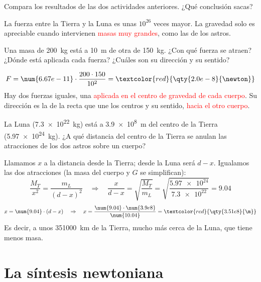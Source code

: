 \begin{exercise}
    Compara los resultados de las dos actividades anteriores. ¿Qué conclusión sacas?
    \begin{solu}
        La fuerza entre la Tierra y la Luna es unas \(10^{26}\) veces mayor. La gravedad solo es apreciable cuando intervienen \textcolor{red}{masas muy grandes}, como las de los astros.
    \end{solu}
\end{exercise}

\begin{exercise}
    Una masa de \qty{200}{\kg} está a \qty{10}{\m} de otra de \qty{150}{\kg}. ¿Con qué fuerza se atraen? ¿Dónde está aplicada cada fuerza? ¿Cuáles son su dirección y su sentido?
    \begin{solu}
        \[ F = \num{6.67e-11} \cdot \frac{200 \cdot 150}{10^2} = \textcolor{red}{\qty{2.0e-8}{\newton}} \]
        Hay dos fuerzas iguales, una \textcolor{red}{aplicada en el centro de gravedad de cada cuerpo}. Su dirección es la de la recta que une los centros y su sentido, \textcolor{red}{hacia el otro cuerpo}.
    \end{solu}
\end{exercise}

\begin{exercise}
    La Luna (\qty{7.3e22}{\kg}) está a \qty{3.9e8}{\m} del centro de la Tierra (\qty{5.97e24}{\kg}). ¿A qué distancia del centro de la Tierra se anulan las atracciones de los dos astros sobre un cuerpo?
    \begin{solu}
        Llamamos \(x\) a la distancia desde la Tierra; desde la Luna será \(d - x\). Igualamos las dos atracciones (la masa del cuerpo y \(G\) se simplifican):
        \[ \frac{M_T}{x^2} = \frac{m_L}{(d - x)^2} \quad\Rightarrow\quad \frac{x}{d - x} = \sqrt{\frac{M_T}{m_L}} = \sqrt{\frac{\num{5.97e24}}{\num{7.3e22}}} = \num{9.04} \]
        \[ x = \num{9.04} \cdot (d - x) \quad\Rightarrow\quad x = \frac{\num{9.04} \cdot \num{3.9e8}}{\num{10.04}} = \textcolor{red}{\qty{3.51e8}{\m}} \]
        Es decir, a unos \qty{351000}{\km} de la Tierra, mucho más cerca de la Luna, que tiene menos masa.
    \end{solu}
\end{exercise}

\section{La síntesis newtoniana}

